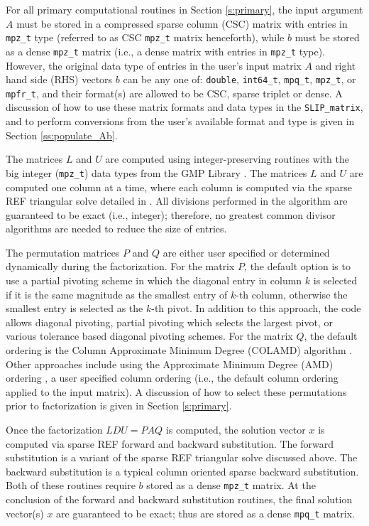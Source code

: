 \documentclass[12pt]{article}
\theoremstyle{definition}
\begin{document}
For all primary computational routines in Section \ref{s:primary}, the input
argument $A$ must be stored in a compressed sparse column (CSC) matrix with
entries in \verb|mpz_t| type (referred to as CSC \verb|mpz_t| matrix
henceforth), while $b$ must be stored as a dense \verb|mpz_t| matrix (i.e., a
dense matrix with entries in \verb|mpz_t| type).  However, the original data
type of entries in the user's input matrix $A$ and right hand side (RHS)
vectors $b$ can be any one of: \verb|double|, \verb|int64_t|, \verb|mpq_t|,
\verb|mpz_t|, or \verb|mpfr_t|, and their format(s) are allowed to be 
CSC, sparse triplet or dense. A discussion of how to use these
matrix formats and data types in the \verb|SLIP_matrix|, and to
perform conversions from the user's available format and type is given 
in Section \ref{ss:populate_Ab}.

The matrices $L$ and $U$ are computed using integer-preserving
routines with the big integer (\verb|mpz_t|) data types from the GMP Library
\cite{granlund2015gnu}. The matrices $L$ and $U$ are computed one column at a
time, where each column is computed via the sparse REF triangular solve
detailed in \cite{lourenco2019exact}. All divisions performed in the algorithm
are guaranteed to be exact (i.e., integer); therefore, no greatest common
divisor algorithms are needed to reduce the size of entries.

The permutation matrices $P$ and $Q$ are either user specified or determined
dynamically during the factorization. For the matrix $P$, the default option is
to use a partial pivoting scheme in which the diagonal entry in column $k$ is
selected if it is the same magnitude as the smallest entry of $k$-th column,
otherwise the smallest entry is selected as the $k$-th pivot. In addition to
this approach, the code allows diagonal pivoting, partial pivoting which
selects the largest pivot, or various tolerance based diagonal pivoting
schemes. For the matrix $Q$, the default ordering is the Column Approximate
Minimum Degree (COLAMD) algorithm
\cite{davis2004algorithmcolamd,davis2004column}. Other approaches include using
the Approximate Minimum Degree (AMD) ordering
\cite{amestoy1996approximate,amestoy2004algorithmamd}, a user specified column
ordering (i.e., the default column ordering applied to the input matrix). A
discussion of how to select these permutations prior to factorization is given
in Section \ref{s:primary}.

Once the factorization $L D U = P A Q $ is computed, the solution vector 
$x$ is computed via sparse REF forward and backward substitution. 
The forward substitution is a variant of the sparse REF triangular solve 
discussed above. The backward substitution is a typical column oriented 
sparse backward substitution. Both of these routines require $b$ 
stored as a dense \verb|mpz_t| matrix. At the conclusion of the forward and 
backward substitution routines, the final solution vector(s) $x$ 
are guaranteed to be exact; thus are stored as a dense \verb|mpq_t| matrix.
\end{document}
